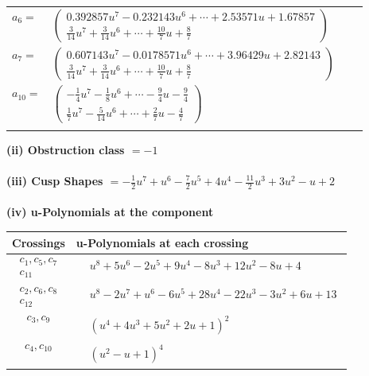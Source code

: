\documentclass[1p]{elsarticle_modified}
\theoremstyle{definition}
\begin{document}
\begin{tabular}{m{7pt} m{180pt} m{7pt} m{180pt} }
\flushright $a_{6}=$&$\begin{pmatrix}0.392857 u^{7}-0.232143 u^{6}+\cdots+2.53571 u+1.67857\\\frac{3}{14} u^7+\frac{3}{14} u^6+\cdots+\frac{10}{7} u+\frac{8}{7}\end{pmatrix}$ \\
\flushright $a_{7}=$&$\begin{pmatrix}0.607143 u^{7}-0.0178571 u^{6}+\cdots+3.96429 u+2.82143\\\frac{3}{14} u^7+\frac{3}{14} u^6+\cdots+\frac{10}{7} u+\frac{8}{7}\end{pmatrix}$ \\
\flushright $a_{10}=$&$\begin{pmatrix}-\frac{1}{4} u^7-\frac{1}{8} u^6+\cdots-\frac{9}{4} u-\frac{9}{4}\\\frac{1}{7} u^7-\frac{5}{14} u^6+\cdots+\frac{2}{7} u-\frac{4}{7}\end{pmatrix}$\\&\end{tabular}
\flushleft \textbf{(ii) Obstruction class $= -1$}\\~\\
\flushleft \textbf{(iii) Cusp Shapes $= -\frac{1}{2} u^7+u^6-\frac{7}{2} u^5+4 u^4-\frac{11}{2} u^3+3 u^2- u+2$}\\~\\
\newpage\renewcommand{\arraystretch}{1}
\flushleft \textbf{(iv) u-Polynomials at the component}\newline \\
\begin{tabular}{m{50pt}|m{274pt}}
Crossings & \hspace{64pt}u-Polynomials at each crossing \\
\hline $$\begin{aligned}c_{1},c_{5},c_{7}\\c_{11}\end{aligned}$$&$\begin{aligned}
&u^8+5 u^6-2 u^5+9 u^4-8 u^3+12 u^2-8 u+4
\end{aligned}$\\
\hline $$\begin{aligned}c_{2},c_{6},c_{8}\\c_{12}\end{aligned}$$&$\begin{aligned}
&u^8-2 u^7+u^6-6 u^5+28 u^4-22 u^3-3 u^2+6 u+13
\end{aligned}$\\
\hline $$\begin{aligned}c_{3},c_{9}\end{aligned}$$&$\begin{aligned}
&(u^4+4 u^3+5 u^2+2 u+1)^2
\end{aligned}$\\
\hline $$\begin{aligned}c_{4},c_{10}\end{aligned}$$&$\begin{aligned}
&(u^2- u+1)^4
\end{aligned}$\\
\hline
\end{tabular}\\~\\
\end{document}
